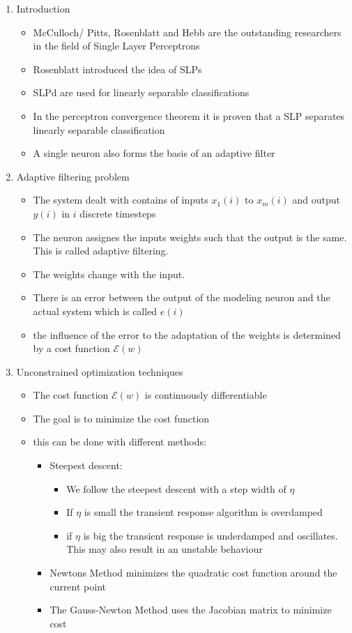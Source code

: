 \documentclass{scrartcl}
\begin{document}
\begin{enumerate}
	\item Introduction
	\begin{itemize}
		\item McCulloch/ Pitts, Rosenblatt and Hebb are the outstanding researchers in the field of Single Layer Perceptrons
		\item Rosenblatt introduced the idea of SLPs
		\item SLPd are used for linearly separable classifications
		\item In the perceptron convergence theorem it is proven that a SLP separates linearly separable classification
		\item A single neuron also forms the basis of an adaptive filter
	\end{itemize}

	\item Adaptive filtering problem
	\begin{itemize}
		\item The system dealt with contains of inputs $x_{1}(i)$ to $x_{m}(i)$ and output $y(i)$ in $i$ discrete timesteps
		\item The neuron assignes the inputs weights such that the output is the same. This is called adaptive filtering.
		\item The weights change with the input.
		\item There is an error between the output of the modeling neuron and the actual system which is called $e(i)$
		\item the influence of the error to the adaptation of the weights is determined by a cost function $\mathscr{E}(w)$
	\end{itemize}

	\item Unconstrained optimization techniques
	\begin{itemize}
		\item The cost function $\mathscr{E}(w)$ is continuously differentiable
		\item The goal is to minimize the cost function
		\item this can be done with different methods:
		\begin{itemize}
			\item Steepest descent:
			\begin{itemize}
						\item We follow the steepest descent with a step width of $\eta$
						\item If $\eta$ is small the transient response algorithm is overdamped
						\item if $\eta$ is big the transient response is underdamped and oscillates. This may also result in an unstable behaviour
						\end{itemize}
			\item Newtons Method minimizes the quadratic cost function around the current point
			\item  The Gauss-Newton Method uses the Jacobian matrix to minimize cost
		\end{itemize}
	\end{itemize}


\end{enumerate}
\end{document}
